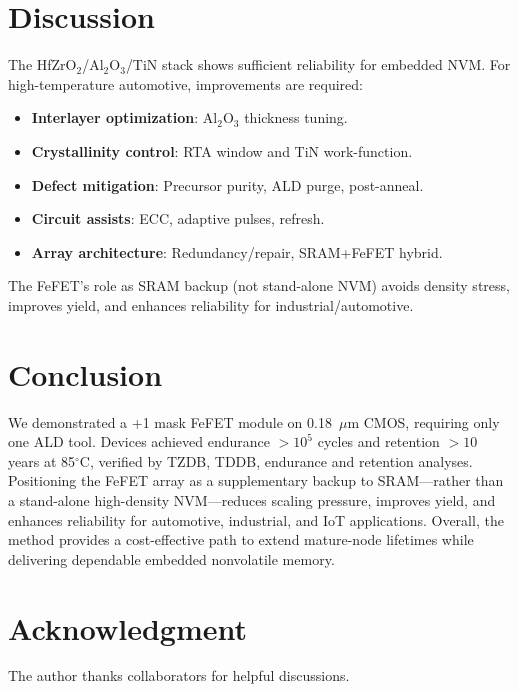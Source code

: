 \documentclass[conference]{IEEEtran}
\begin{document}
\section{Discussion}
The HfZrO$_2$/Al$_2$O$_3$/TiN stack shows sufficient reliability for embedded NVM.  
For high-temperature automotive, improvements are required:
\begin{itemize}
  \item \textbf{Interlayer optimization}: Al$_2$O$_3$ thickness tuning.
  \item \textbf{Crystallinity control}: RTA window and TiN work-function.
  \item \textbf{Defect mitigation}: Precursor purity, ALD purge, post-anneal.
  \item \textbf{Circuit assists}: ECC, adaptive pulses, refresh. 
  \item \textbf{Array architecture}: Redundancy/repair, SRAM+FeFET hybrid.
\end{itemize}

The FeFET’s role as SRAM backup (not stand-alone NVM) avoids density stress, improves yield, and enhances reliability for industrial/automotive.

\FloatBarrier

\section{Conclusion}
We demonstrated a +1 mask FeFET module on 0.18~$\mu$m CMOS, requiring only one ALD tool.  
Devices achieved endurance $>10^5$ cycles and retention $>10$ years at 85$^\circ$C, verified by TZDB, TDDB, endurance and retention analyses.  
Positioning the FeFET array as a supplementary backup to SRAM—rather than a stand-alone high-density NVM—reduces scaling pressure, improves yield, and enhances reliability for automotive, industrial, and IoT applications.  
Overall, the method provides a cost-effective path to extend mature-node lifetimes while delivering dependable embedded nonvolatile memory.

\FloatBarrier

\section*{Acknowledgment}
The author thanks collaborators for helpful discussions.
\end{document}
